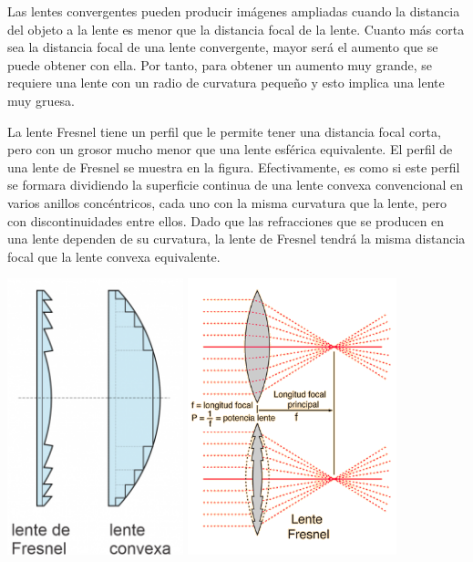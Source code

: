 \begin{tcolorbox}[title = {Lente de Fresnel}
  ]
  { \footnotesize
Las lentes convergentes pueden producir imágenes ampliadas cuando la distancia del objeto a la lente es menor que la distancia focal de la lente. Cuanto más corta sea la distancia focal de una lente convergente, mayor será el aumento que se puede obtener con ella. Por tanto, para obtener un aumento muy grande, se requiere una lente con un radio de curvatura pequeño y esto implica una lente muy gruesa.

La lente Fresnel tiene un perfil que le permite tener una distancia focal corta, pero con un grosor mucho menor que una lente esférica equivalente. El perfil de una lente de Fresnel se muestra en la figura. Efectivamente, es como si este perfil se formara dividiendo la superficie continua de una lente convexa convencional en varios anillos concéntricos, cada uno con la misma curvatura que la lente, pero con discontinuidades entre ellos. Dado que las refracciones que se producen en una lente dependen de su curvatura, la lente de Fresnel tendrá la misma distancia focal que la lente convexa equivalente.
}
  \begin{center}
%
\includegraphics[height = 8cm ]{06.radionavegacion/Imagenes/06.03.ils.imagenes/FresnelLente.png}
\includegraphics[height = 8cm ]{06.radionavegacion/Imagenes/06.03.ils.imagenes/Intensidad_del_lente_de_fresnel.gif}
 \end{center}
%


\end{tcolorbox}
